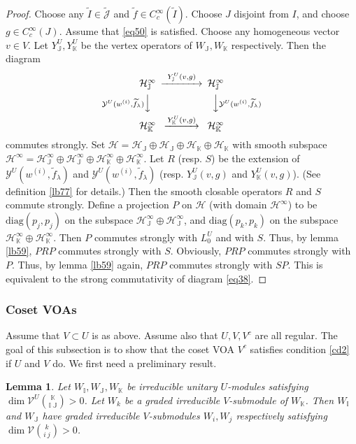 \documentclass[11pt,b5paper,notitlepage]{article}
\theoremstyle{definition}
\theoremstyle{plain}
\newtheorem{lm}[df]{Lemma}
\newcommand{\mc}{\mathcal}
\newcommand{\wtd}{\widetilde}
\newcommand{\diag}{\mathrm{diag}}
\newcommand{\Jtd}{\widetilde{\mathcal J}}
\newcommand{\mbb}{\mathbb}
\numberwithin{equation}{subsection}
\begin{document}
\begin{proof}
	Choose any $\wtd I\in\Jtd$ and $\wtd f\in C_c^\infty(\wtd I)$. Choose $J$ disjoint from $I$, and choose $g\in C_c^\infty(J)$. Assume that \eqref{eq50} is satisfied. Choose any homogeneous vector $v\in V$. Let $Y_{\mbb J}^U,Y_{\mbb K}^U$ be the vertex operators of $W_{\mbb J},W_{\mbb K}$ respectively. Then the diagram
	\begin{align}
	\begin{CD}
	\mc H_{\mbb J}^\infty @>~Y_{\mbb J}^U(v,g)~>> \mc H_{\mbb J}^\infty\\
	@V \mc Y^U(w^{(i)},\wtd f_\lambda)  VV @VV \mc Y^U(w^{(i)},\wtd f_\lambda) V\\
	\mc H_{\mbb K}^\infty @> Y^U_{\mbb K}(v,g)>> \mc H_{\mbb K}^\infty
	\end{CD}
	\end{align}	
	commutes strongly. Set $\mc H=\mc H_{\mbb J}\oplus \mc H_{\mbb J}\oplus \mc H_{\mbb K}\oplus \mc H_{\mbb K}$ with smooth subspace $\mc H^\infty=\mc H_{\mbb J}^\infty\oplus \mc H_{\mbb J}^\infty\oplus \mc H_{\mbb K}^\infty\oplus \mc H_{\mbb K}^\infty$. Let $R$  (resp. $S$) be  the extension of  $\mc Y^U(w^{(i)},\wtd f_\lambda)$ and $\mc Y^U(w^{(i)},\wtd f_\lambda)$ (resp. $Y_{\mbb J}^U(v,g)$ and $Y_{\mbb K}^U(v,g)$). (See definition \ref{lb77} for details.) Then the smooth closable operators $R$ and $S$ commute strongly. Define a projection $P$ on $\mc H$ (with domain $\mc H^\infty$) to be $\diag(p_j,p_j)$ on the subspace $\mc H_{\mbb J}^\infty\oplus \mc H_{\mbb J}^\infty$, and $\diag(p_k,p_k)$ on the subspace $\mc H_{\mbb K}^\infty\oplus \mc H_{\mbb K}^\infty$. Then $P$ commutes strongly with $L^U_0$ and with $S$. Thus, by lemma \ref{lb59}, $PRP$ commutes strongly with $S$. Obviously, $PRP$  commutes strongly with $P$. Thus, by lemma \ref{lb59} again, $PRP$ commutes strongly with $SP$. This is equivalent to the strong commutativity of diagram \eqref{eq38}.
\end{proof}



\subsubsection*{Coset VOAs}

Assume that $V\subset U$ is as above. Assume also that  $U,V,V^c$ are all regular. The goal of this subsection is to show that the coset VOA $V^c$ satisfies condition \ref{cd2} if $U$ and $V$ do. We first need a preliminary result.

\begin{lm}\label{lb89}
Let $W_{\mbb I},W_{\mbb J},W_{\mbb K}$ be irreducible unitary $U$-modules satisfying $\dim\mc V^U{\mbb K\choose\mbb I~\mbb J}>0$. Let $W_k$ be a graded irreducible  $V$-submodule of $W_{\mbb K}$. Then $W_{\mbb I}$ and $W_{\mbb J}$ have graded irreducible $V$-submodules $W_i,W_j$ respectively satisfying $\dim\mc V{k\choose i~j}>0$.
\end{lm}
\end{document}
